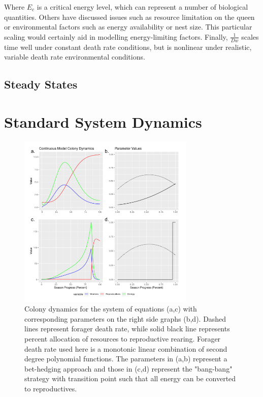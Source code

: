 \documentclass[12pt]{report}
\begin{document}
Where $E_c$  is a critical energy level, which can represent a number of biological quantities. Others have discussed issues such as resource limitation on the queen \cite{mitesser2007optimal} or environmental factors such as energy availability or nest size. This particular scaling would certainly aid in modelling energy-limiting factors. Finally, $\frac{1}{Dw}$ scales time well under constant death rate conditions, but is nonlinear under realistic, variable death rate environmental conditions.

\subsection*{Steady States}

\section*{Standard System Dynamics}

\begin{figure}[t]
\centering
    \includegraphics[width=0.75\textwidth]{continuousall.png}
    \caption{Colony dynamics for the system of equations (a,c) with corresponding parameters on the right side graphs (b,d). Dashed lines represent forager death rate, while solid black line represents percent allocation of resources to reproductive rearing. Forager death rate used here is a monotonic linear combination of second degree polynomial functions. The parameters in (a,b) represent a bet-hedging approach and those in (c,d) represent the "bang-bang" strategy with transition point such that all energy can be converted to reproductives.}
    \label{fig: Continuous dynamics}
\end{figure}
 
\end{document}
